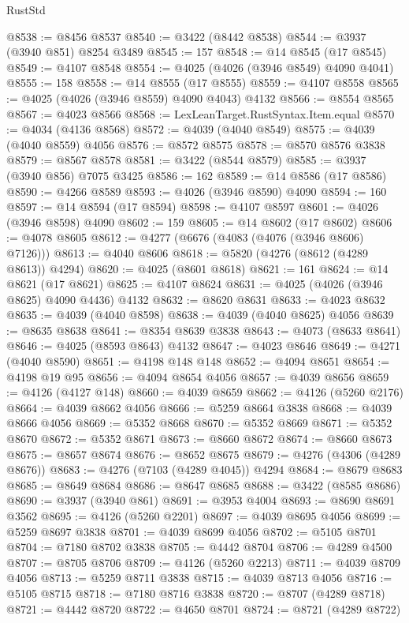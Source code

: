 \begin{lexlean}{RustStd}
\begin{coremodule}
@8538 := @8456 @8537
@8540 := @3422 (@8442 @8538)
@8544 := @3937 (@3940 @851) @8254 @3489
@8545 := 157
@8548 := @14 @8545 (@17 @8545)
@8549 := @4107 @8548
@8554 := @4025 (@4026 (@3946 @8549) @4090 @4041)
@8555 := 158
@8558 := @14 @8555 (@17 @8555)
@8559 := @4107 @8558
@8565 := @4025 (@4026 (@3946 @8559) @4090 @4043) @4132
@8566 := @8554 @8565
@8567 := @4023 @8566
@8568 := LexLeanTarget.RustSyntax.Item.equal
@8570 := @4034 (@4136 @8568)
@8572 := @4039 (@4040 @8549)
@8575 := @4039 (@4040 @8559) @4056
@8576 := @8572 @8575
@8578 := @8570 @8576 @3838
@8579 := @8567 @8578
@8581 := @3422 (@8544 @8579)
@8585 := @3937 (@3940 @856) @7075 @3425
@8586 := 162
@8589 := @14 @8586 (@17 @8586)
@8590 := @4266 @8589
@8593 := @4026 (@3946 @8590) @4090
@8594 := 160
@8597 := @14 @8594 (@17 @8594)
@8598 := @4107 @8597
@8601 := @4026 (@3946 @8598) @4090
@8602 := 159
@8605 := @14 @8602 (@17 @8602)
@8606 := @4078 @8605
@8612 := @4277 (@6676 (@4083 (@4076 (@3946 @8606) @7126)))
@8613 := @4040 @8606
@8618 := @5820 (@4276 (@8612 (@4289 @8613)) @4294)
@8620 := @4025 (@8601 @8618)
@8621 := 161
@8624 := @14 @8621 (@17 @8621)
@8625 := @4107 @8624
@8631 := @4025 (@4026 (@3946 @8625) @4090 @4436) @4132
@8632 := @8620 @8631
@8633 := @4023 @8632
@8635 := @4039 (@4040 @8598)
@8638 := @4039 (@4040 @8625) @4056
@8639 := @8635 @8638
@8641 := @8354 @8639 @3838
@8643 := @4073 (@8633 @8641)
@8646 := @4025 (@8593 @8643) @4132
@8647 := @4023 @8646
@8649 := @4271 (@4040 @8590)
@8651 := @4198 @148 @148
@8652 := @4094 @8651
@8654 := @4198 @19 @95
@8656 := @4094 @8654 @4056
@8657 := @4039 @8656
@8659 := @4126 (@4127 @148)
@8660 := @4039 @8659
@8662 := @4126 (@5260 @2176)
@8664 := @4039 @8662 @4056
@8666 := @5259 @8664 @3838
@8668 := @4039 @8666 @4056
@8669 := @5352 @8668
@8670 := @5352 @8669
@8671 := @5352 @8670
@8672 := @5352 @8671
@8673 := @8660 @8672
@8674 := @8660 @8673
@8675 := @8657 @8674
@8676 := @8652 @8675
@8679 := @4276 (@4306 (@4289 @8676))
@8683 := @4276 (@7103 (@4289 @4045)) @4294
@8684 := @8679 @8683
@8685 := @8649 @8684
@8686 := @8647 @8685
@8688 := @3422 (@8585 @8686)
@8690 := @3937 (@3940 @861)
@8691 := @3953 @4004
@8693 := @8690 @8691 @3562
@8695 := @4126 (@5260 @2201)
@8697 := @4039 @8695 @4056
@8699 := @5259 @8697 @3838
@8701 := @4039 @8699 @4056
@8702 := @5105 @8701
@8704 := @7180 @8702 @3838
@8705 := @4442 @8704
@8706 := @4289 @4500
@8707 := @8705 @8706
@8709 := @4126 (@5260 @2213)
@8711 := @4039 @8709 @4056
@8713 := @5259 @8711 @3838
@8715 := @4039 @8713 @4056
@8716 := @5105 @8715
@8718 := @7180 @8716 @3838
@8720 := @8707 (@4289 @8718)
@8721 := @4442 @8720
@8722 := @4650 @8701
@8724 := @8721 (@4289 @8722)

\end{coremodule}
\end{lexlean}
